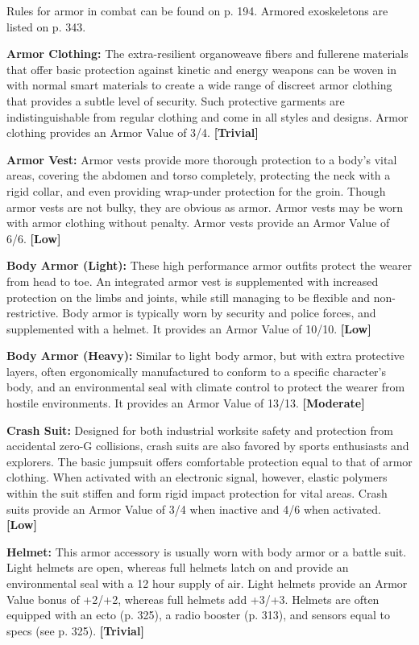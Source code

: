 Rules for armor in combat can be found on p. 194. Armored exoskeletons are listed on p. 343.

\textbf{Armor Clothing:} The extra-resilient organoweave fibers and fullerene materials that offer basic protection against kinetic and energy weapons can be woven in with normal smart materials to create a wide range of discreet armor clothing that provides a subtle level of security. Such protective garments are indistinguishable from regular clothing and come in all styles and designs. Armor clothing provides an Armor Value of 3/4. \textbf{[Trivial]}

\textbf{Armor Vest:} Armor vests provide more thorough protection to a body’s vital areas, covering the abdomen and torso completely, protecting the neck with a rigid collar, and even providing wrap-under protection for the groin. Though armor vests are not bulky, they are obvious as armor. Armor vests may be worn with armor clothing without penalty. Armor vests provide an Armor Value of 6/6. \textbf{[Low]}

\textbf{Body Armor (Light):} These high performance armor outfits protect the wearer from head to toe. An integrated armor vest is supplemented with increased protection on the limbs and joints, while still managing to be flexible and non-restrictive. Body armor is typically worn by security and police forces, and supplemented with a helmet. It provides an Armor Value of 10/10. \textbf{[Low]}

\textbf{Body Armor (Heavy):} Similar to light body armor, but with extra protective layers, often ergonomically manufactured to conform to a specific character’s body, and an environmental seal with climate control to protect the wearer from hostile environments. It provides an Armor Value of 13/13. \textbf{[Moderate]}

\textbf{Crash Suit:} Designed for both industrial worksite safety and protection from accidental zero-G collisions, crash suits are also favored by sports enthusiasts and explorers. The basic jumpsuit offers comfortable protection equal to that of armor clothing. When activated with an electronic signal, however, elastic polymers within the suit stiffen and form rigid impact protection for vital areas. Crash suits provide an Armor Value of 3/4 when inactive and 4/6 when activated. \textbf{[Low]}

\textbf{Helmet:} This armor accessory is usually worn with body armor or a battle suit. Light helmets are open, whereas full helmets latch on and provide an environmental seal with a 12 hour supply of air. Light helmets provide an Armor Value bonus of +2/+2, whereas full helmets add +3/+3. Helmets are often equipped with an ecto (p. 325), a radio booster (p. 313), and sensors equal to specs (see p. 325). \textbf{[Trivial]}

